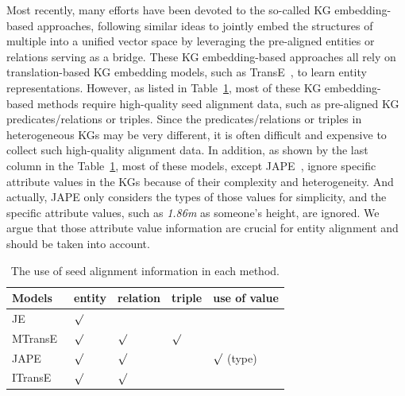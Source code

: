 	Most recently, many efforts have been devoted to the so-called KG embedding-based approaches, following similar ideas to jointly embed
the structures of multiple \KGs into a unified vector space by leveraging the pre-aligned entities or relations serving as a bridge. These
KG embedding-based approaches all rely on translation-based KG embedding models, such as TransE~\cite{bordes2013translating}, to learn
entity representations. However, as listed in Table~\ref{seed}, most of these KG embedding-based methods require high-quality seed
alignment data, such as pre-aligned KG predicates/relations or triples. Since the predicates/relations or triples in heterogeneous KGs may
be very different, it is often difficult and expensive to collect such high-quality alignment data. In addition, as shown by the last
column in the Table~\ref{seed}, most of these models, except JAPE~\cite{sun2017cross}, ignore specific attribute values in the KGs because
of their complexity and heterogeneity. And actually, JAPE only considers the types of those values for simplicity, and the specific
attribute values, such as \textit{1.86m} as someone's height, are ignored. We argue that those attribute value information are crucial for
entity alignment and should be taken into account.
	\begin{table}
		\centering
		\scriptsize
		\begin{tabular}{lllll}
			\toprule
			\bf Models & \bf entity & \bf relation & \bf triple & \bf use of value \\
			\midrule
			JE~\cite{hao2016joint} & ${\surd}$ & & & \\
			MTransE~\cite{chen2016multilingual} & ${\surd}$ & ${\surd}$ & ${\surd}$ & \\
			JAPE~\cite{sun2017cross} & ${\surd}$& ${\surd}$& & ${\surd}$ (type)\\
			ITransE~\cite{zhu2017iterative} & ${\surd}$ & ${\surd}$& & \\
			\bottomrule
		\end{tabular}
		\caption{The use of seed alignment information in each method.}
		\label{seed}
	\end{table}
	
